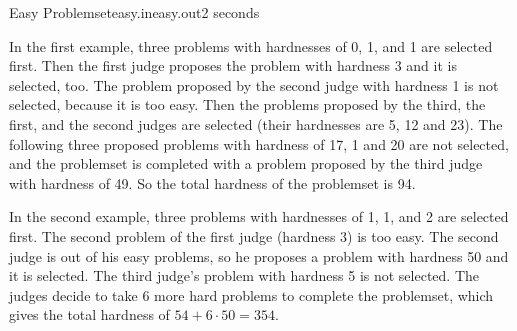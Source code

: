 \begin{problem}{Easy Problemset}{easy.in}{easy.out}{2 seconds}
\Example

\begin{example}
%
%
\end{example}

In the first example, three problems with hardnesses of 0, 1, and 1 are selected first. 
Then the first judge proposes the problem with hardness 3 and it is selected, too. 
The problem proposed by the second judge with hardness 1 is not selected, because it is too easy. 
Then the problems proposed by the third, the first, and the second judges are selected 
(their hardnesses are 5, 12 and 23). The following three proposed problems with hardness of 17, 1 and 20 are not selected,
and the problemset is completed with a problem proposed by the third judge with hardness of 49. So the total hardness of the 
problemset is 94.

In the second example, three problems with hardnesses of 1, 1, and 2 are selected first. 
The second problem of the first judge (hardness 3) is too easy. The second judge is out of his easy problems, 
so he proposes a problem with hardness 50 and it is selected. The third judge's problem with hardness 5 is not selected. 
The judges decide to take 6 more hard problems to complete the problemset, which gives the total hardness of $54 + 6 \cdot 50 = 354$.

\end{problem}

